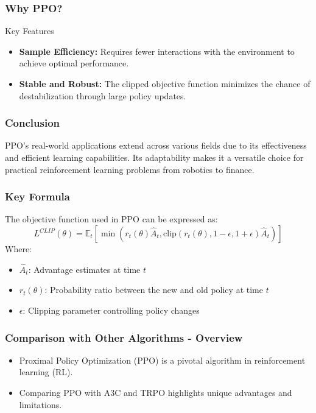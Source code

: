 \documentclass{beamer}
\begin{document}
\begin{frame}[fragile]
    \frametitle{Why PPO?}
    \begin{block}{Key Features}
        \begin{itemize}
            \item \textbf{Sample Efficiency:} Requires fewer interactions with the environment to achieve optimal performance.
            \item \textbf{Stable and Robust:} The clipped objective function minimizes the chance of destabilization through large policy updates.
        \end{itemize}
    \end{block}
\end{frame}

\begin{frame}[fragile]
    \frametitle{Conclusion}
    PPO's real-world applications extend across various fields due to its effectiveness and efficient learning capabilities. Its adaptability makes it a versatile choice for practical reinforcement learning problems from robotics to finance.
\end{frame}

\begin{frame}[fragile]
    \frametitle{Key Formula}
    The objective function used in PPO can be expressed as:
    \begin{equation}
        L^{CLIP}(\theta) = \mathbb{E}_{t} \left[ \min \left( r_t(\theta) \hat{A}_t, \text{clip}(r_t(\theta), 1 - \epsilon, 1 + \epsilon) \hat{A}_t \right) \right]
    \end{equation}
    Where:
    \begin{itemize}
        \item \( \hat{A}_t \): Advantage estimates at time \( t \)
        \item \( r_t(\theta) \): Probability ratio between the new and old policy at time \( t \)
        \item \( \epsilon \): Clipping parameter controlling policy changes
    \end{itemize}
\end{frame}

\begin{frame}[fragile]
    \frametitle{Comparison with Other Algorithms - Overview}
    \begin{itemize}
        \item Proximal Policy Optimization (PPO) is a pivotal algorithm in reinforcement learning (RL).
        \item Comparing PPO with A3C and TRPO highlights unique advantages and limitations.
    \end{itemize}
\end{frame}
\end{document}
